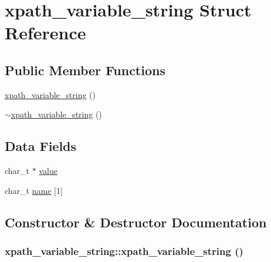 \hypertarget{structxpath__variable__string}{
\section{xpath\_\-variable\_\-string Struct Reference}
\label{structxpath__variable__string}
}
\subsection*{Public Member Functions}
\begin{CompactItemize}
\item 
\hyperlink{structxpath__variable__string_119d348b7f76371928faa5f5f80df815}{xpath\_\-variable\_\-string} ()
\item 
\hyperlink{structxpath__variable__string_8e5e421f2e963e6196d2812a623ee912}{$\sim$xpath\_\-variable\_\-string} ()
\end{CompactItemize}
\subsection*{Data Fields}
\begin{CompactItemize}
\item 
char\_\-t $\ast$ \hyperlink{structxpath__variable__string_eb8a87a8457d2615cd7b766fd3f30559}{value}
\item 
char\_\-t \hyperlink{structxpath__variable__string_5c43cdcc55a620db0e7bdd29b4d56e89}{name} \mbox{[}1\mbox{]}
\end{CompactItemize}


\subsection{Constructor \& Destructor Documentation}
\hypertarget{structxpath__variable__string_119d348b7f76371928faa5f5f80df815}{
\subsubsection[xpath\_\-variable\_\-string]{\setlength{\rightskip}{0pt plus 5cm}xpath\_\-variable\_\-string::xpath\_\-variable\_\-string ()}}
\label{structxpath__variable__string_119d348b7f76371928faa5f5f80df815}


